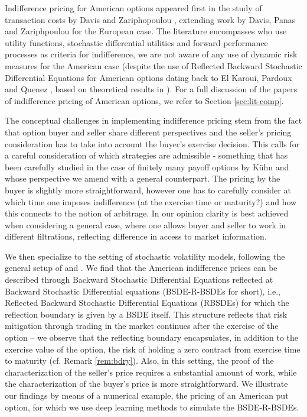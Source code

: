 \documentclass{article}
\begin{document}
Indifference pricing for American options appeared first in the study of transaction costs by Davis and Zariphopoulou \cite{DZ95}, extending work by Davis, Panas and Zariphpoulou \cite{DPZ93} for the European case. The literature encompasses \cite{BZ14, Dam06, GK22, Kue02, LS09, LSZ12, OZ03, WD09, YLY15, Zak05} who use utility functions, stochastic differential utilities and forward performance processes as criteria for indifference, we are not aware of any use of dynamic risk measures for the American case (despite the use of Reflected Backward Stochastic Differential Equations for American options dating back to El Karoui, Pardoux and Quenez \cite{EKPQ97}, based on theoretical results in \cite{EKKPPQ97}). For a full discussion of the papers of indifference pricing of American options, we refer to Section \ref{sec:lit-comp}.

The conceptual challenges in implementing indifference pricing stem from the fact that option buyer and seller share different perspectives and the seller's pricing consideration has to take into account the buyer's exercise decision. This calls for a careful consideration of which strategies are admissible - something that has been carefully studied in the case of finitely many payoff options by K\"{u}hn \cite{Kue02} and whose perspective we amend with a general counterpart. The pricing by the buyer is slightly more straightforward, however one has to carefully consider at which time one imposes indifference (at the exercise time or maturity?) and how this connects to the notion of arbitrage. In our opinion clarity is best achieved when considering a general case, where one allows buyer and seller to work in different filtrations, reflecting difference in access to market information.

We then specialize to the setting of stochastic volatility models, following the general setup of \cite{SS15} and \cite{Kum15}. We find that the American indifference prices can be described through Backward Stochastic Differential Equations reflected at Backward Stochastic Differential equations (BSDE-R-BSDEs for short), i.e., Reflected Backward Stochastic Differential Equations (RBSDEs) for which the reflection boundary is given by a BSDE itself. This structure reflects that risk mitigation through trading in the market continues after the exercise of the option -- we observe that the reflecting boundary encapsulates, in addition to the exercise value of the option,  the risk of holding a zero contract from exercise time to maturity (cf. Remark \ref{rem:bdry}). Also, in this setting, the proof of the characterization of the seller's price requires a substantial amount of work, while the characterization of the buyer's price is more straightforward. We illustrate our findings by means of a numerical example, the pricing of an American put option, for which we use deep learning methods to simulate the BSDE-R-BSDEs.
\end{document}
